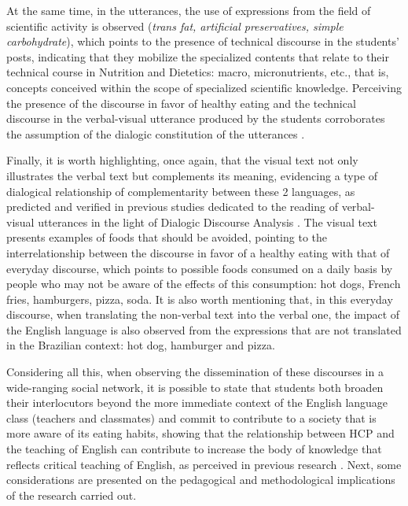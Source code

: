 \documentclass[english]{textolivre}
\begin{document}
At the same time, in the utterances, the use of expressions from the field of scientific activity is observed (\emph{trans fat, artificial preservatives, simple carbohydrate}), which points to the presence of technical discourse in the students’ posts, indicating that they mobilize the specialized contents that relate to their technical course in Nutrition and Dietetics: macro, micronutrients, etc., that is, concepts conceived within the scope of specialized scientific knowledge. Perceiving the presence of the discourse in favor of healthy eating and the technical discourse in the verbal-visual utterance produced by the students corroborates the assumption of the dialogic constitution of the utterances \cite{bakhtin_os_2016}.

Finally, it is worth highlighting, once again, that the visual text not only illustrates the verbal text but complements its meaning, evidencing a type of dialogical relationship of complementarity between these 2 languages, as predicted and verified in previous studies dedicated to the reading of verbal-visual utterances in the light of Dialogic Discourse Analysis \cite{brait_olhar_2013, limade2022auto}. The visual text presents examples of foods that should be avoided, pointing to the interrelationship between the discourse in favor of a healthy eating with that of everyday discourse, which points to possible foods consumed on a daily basis by people who may not be aware of the effects of this consumption: hot dogs, French fries, hamburgers, pizza, soda. It is also worth mentioning that, in this everyday discourse, when translating the non-verbal text into the verbal one, the impact of the English language is also observed from the expressions that are not translated in the Brazilian context: hot dog, hamburger and pizza.

Considering all this, when observing the dissemination of these discourses in a wide-ranging social network, it is possible to state that students both broaden their interlocutors beyond the more immediate context of the English language class (teachers and classmates) and commit to contribute to a society that is more aware of its eating habits, showing that the relationship between HCP and the teaching of English can contribute to increase the body of knowledge that reflects critical teaching of English, as perceived in previous research \cite[among others]{urzeda-freitas_educando_2012, costados2011visualizaccao, caetano_but_2020, mulico_learning_2020}. Next, some considerations are presented on the pedagogical and methodological implications of the research carried out.
\end{document}
